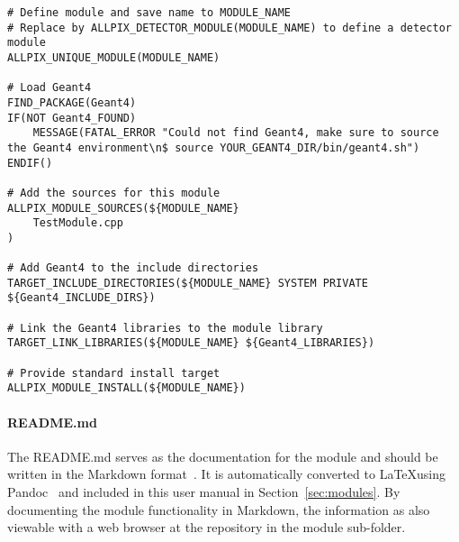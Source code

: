 \begin{verbatim}
# Define module and save name to MODULE_NAME
# Replace by ALLPIX_DETECTOR_MODULE(MODULE_NAME) to define a detector module
ALLPIX_UNIQUE_MODULE(MODULE_NAME)

# Load Geant4
FIND_PACKAGE(Geant4)
IF(NOT Geant4_FOUND)
    MESSAGE(FATAL_ERROR "Could not find Geant4, make sure to source the Geant4 environment\n$ source YOUR_GEANT4_DIR/bin/geant4.sh")
ENDIF()

# Add the sources for this module
ALLPIX_MODULE_SOURCES(${MODULE_NAME}
    TestModule.cpp
)

# Add Geant4 to the include directories
TARGET_INCLUDE_DIRECTORIES(${MODULE_NAME} SYSTEM PRIVATE ${Geant4_INCLUDE_DIRS})

# Link the Geant4 libraries to the module library
TARGET_LINK_LIBRARIES(${MODULE_NAME} ${Geant4_LIBRARIES})

# Provide standard install target
ALLPIX_MODULE_INSTALL(${MODULE_NAME})
\end{verbatim}

\paragraph{README.md}
The README.md serves as the documentation for the module and should be written in the Markdown format~\cite{markdown}.
It is automatically converted to \LaTeX using Pandoc~\cite{pandoc} and included in this user manual in Section~\ref{sec:modules}.
By documenting the module functionality in Markdown, the information as also viewable with a web browser at the repository in the module sub-folder.

